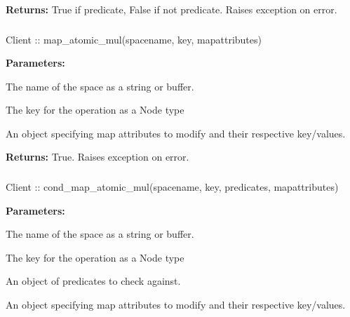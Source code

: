 \noindent\textbf{Returns:}
True if predicate, False if not predicate.  Raises exception on error.

\subsubsection{}
\label{api:nodejs:map_atomic_mul}
\begin{javascriptcode}
Client :: map_atomic_mul(spacename, key, mapattributes)
\end{javascriptcode}


\noindent\textbf{Parameters:}
\begin{description}[labelindent=\widthof{{\code{mapattributes}}},leftmargin=*,noitemsep,nolistsep,align=right]
\item[\code{spacename}] The name of the space as a string or buffer.
\item[\code{key}] The key for the operation as a Node type
\item[\code{mapattributes}] An object specifying map attributes to modify and their respective key/values.
\end{description}

\noindent\textbf{Returns:}
True.  Raises exception on error.

\subsubsection{}
\label{api:nodejs:cond_map_atomic_mul}
\begin{javascriptcode}
Client :: cond_map_atomic_mul(spacename, key, predicates, mapattributes)
\end{javascriptcode}


\noindent\textbf{Parameters:}
\begin{description}[labelindent=\widthof{{\code{mapattributes}}},leftmargin=*,noitemsep,nolistsep,align=right]
\item[\code{spacename}] The name of the space as a string or buffer.
\item[\code{key}] The key for the operation as a Node type
\item[\code{predicates}] An object of predicates to check against.
\item[\code{mapattributes}] An object specifying map attributes to modify and their respective key/values.
\end{description}

